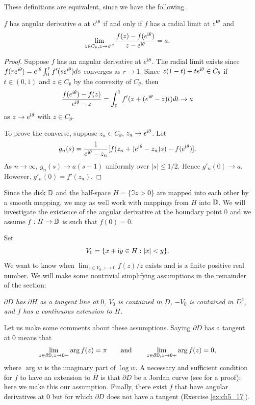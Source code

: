 These definitions are equivalent, since we have the following.

\begin{proposition}\label{prop:ch5_5.1}
$f$ has angular derivative $a$ at $e^{\mathrm{i}\theta}$ if and only if $f$ has a radial limit at $e^{\mathrm{i}\theta}$ and
\[
    \lim_{z\in C_\theta,z\to e^{\mathrm{i}\theta}} \frac{f(z) - f(e^{\mathrm{i}\theta})}{z - e^{\mathrm{i}\theta}} = a.
\]
\end{proposition}

\begin{proof}
Suppose $f$ has an angular derivative at $e^{\mathrm{i}\theta}$. The radial limit exists since $f(re^{\mathrm{i}\theta}) = e^{\mathrm{i}\theta}\int_0^r f'(se^{\mathrm{i}\theta})ds$ converges as $r \to 1$. Since $z(1-t)+te^{\mathrm{i}\theta} \in C_\theta$ if $t \in (0,1)$ and $z \in C_\theta$ by the convexity of $C_\theta$, then
\[
    \frac{f(e^{\mathrm{i}\theta}) - f(z)}{e^{\mathrm{i}\theta} - z} = \int_0^1 f'(z + (e^{\mathrm{i}\theta}-z)t)dt \to a
\]
as $z \to e^{\mathrm{i}\theta}$ with $z \in C_\theta$.

To prove the converse, suppose $z_n \in C_\theta$, $z_n \to e^{\mathrm{i}\theta}$. Let
\[
    g_n(s) = \frac{1}{e^{\mathrm{i}\theta} - z_n}[f(z_n + (e^{\mathrm{i}\theta} - z_n)s) - f(e^{\mathrm{i}\theta})].
\]
As $n \to \infty$, $g_n(s) \to a(s-1)$ uniformly over $|s| \leq 1/2$. Hence $g'_n(0) \to a$. However, $g'_n(0) = f'(z_n)$.
\end{proof}

Since the disk $\mathbb{D}$ and the half-space $H = \{\Im z > 0\}$ are mapped into each other by a smooth mapping, we may as well work with mappings from $H$ into $\mathbb{D}$. We will investigate the existence of the angular derivative at the boundary point 0 and we assume $f: H \to \mathbb{D}$ is such that $f(0) = 0$.

Set
\begin{equation}\label{eq:ch5_5.2}
    V_0 = \{x + \mathrm{i} y \in H : |x| < y\}.
\end{equation}
We want to know when $\lim_{z \in V_0,z \to 0} f(z)/z$ exists and is a finite positive real number. We will make some nontrivial simplifying assumptions in the remainder of the section:
\begin{obs}\label{obs:ch5_5.3}
    \textit{$\partial D$ has $\partial H$ as a tangent line at $0$, $V_0$ is contained in $D$, $-V_0$ is contained in $D^c$, and $f$ has a continuous extension to $\overline{H}$.}
\end{obs}

Let us make some comments about these assumptions. Saying $\partial D$ has a tangent at $0$ means that
\[
    \lim_{z \in \partial \mathbb{D},z \to 0-} \arg f(z) = \pi \qquad \text{and} \qquad \lim_{z \in \partial \mathbb{D},z \to 0+} \arg f(z) = 0,
\]
where $\arg w$ is the imaginary part of $\log w$. A necessary and sufficient condition for $f$ to have an extension to $\overline{H}$ is that $\partial D$ be a Jordan curve (see \cite{Pommerenke1975} for a proof); here we make this our assumption. Finally, there exist $f$ that have angular derivatives at $0$ but for which $\partial D$ does not have a tangent (Exercise \ref{ex:ch5_17}).

